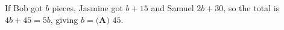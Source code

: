 If Bob got $b$ pieces, Jasmine got $b+15$ and Samuel $2b+30$, so the total is $4b+45=5b$, giving $b=\boxed{\textbf{(A) }45}$.
